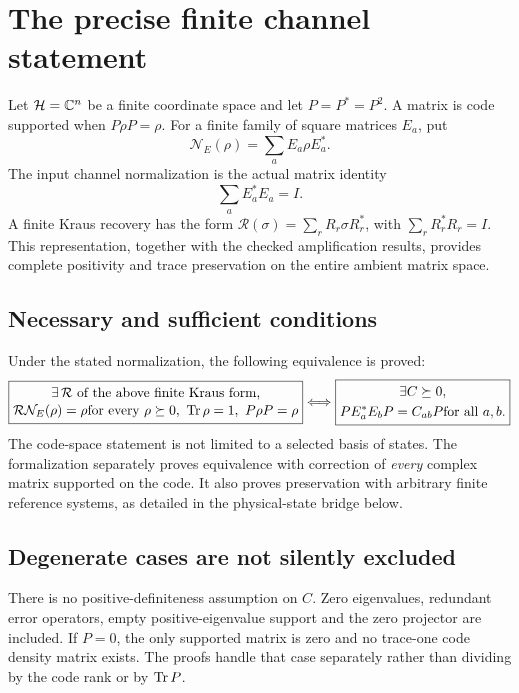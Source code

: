 \section{The precise finite channel statement}\label{supp5:section:001}
Let $\mathcal H=\C^n$ be a finite coordinate space and let $P=P^*=P^2$. A matrix is code supported when $P\rho P=\rho$. For a finite family of square matrices $E_a$, put
\[
\mathcal N_E(\rho)=\sum_a E_a\rho E_a^*.
\]
The input channel normalization is the actual matrix identity
\[
\sum_a E_a^*E_a=I.
\]
A finite Kraus recovery has the form $\mathcal R(\sigma)=\sum_r R_r\sigma R_r^*$, with $\sum_rR_r^*R_r=I$. This representation, together with the checked amplification results, provides complete positivity and trace preservation on the entire ambient matrix space.

\subsection{Necessary and sufficient conditions}
Under the stated normalization, the following equivalence is proved:
\[
\boxed{\begin{gathered}
\exists\,\mathcal R\text{ of the above finite Kraus form,}\\[-2pt]
\mathcal R\mathcal N_E(\rho)=\rho
\quad\text{for every }\rho\succeq0,\ \Tr\rho=1,\ P\rho P=\rho
\end{gathered}}
\quad\Longleftrightarrow\quad
\boxed{\begin{gathered}
\exists C\succeq0,\\
PE_a^*E_bP=C_{ab}P\quad\text{for all }a,b.
\end{gathered}}
\]
The code-space statement is not limited to a selected basis of states. The formalization separately proves equivalence with correction of \emph{every} complex matrix supported on the code. It also proves preservation with arbitrary finite reference systems, as detailed in the physical-state bridge below.



\subsection{Degenerate cases are not silently excluded}
There is no positive-definiteness assumption on $C$. Zero eigenvalues, redundant error operators, empty positive-eigenvalue support and the zero projector are included. If $P=0$, the only supported matrix is zero and no trace-one code density matrix exists. The proofs handle that case separately rather than dividing by the code rank or by $\operatorname{Tr} P$.

